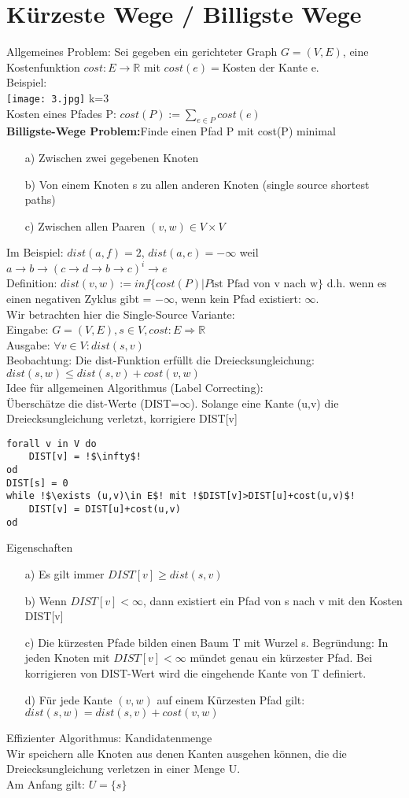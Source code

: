\documentclass[a4paper]{article}
\begin{document}
\section{Kürzeste Wege / Billigste Wege}
Allgemeines Problem: Sei gegeben ein gerichteter Graph $G=(V,E)$, eine Kostenfunktion $cost:E\rightarrow \mathbb{R}$ mit $cost(e)=$Kosten der Kante e.\\
Beispiel:\\
\texttt{[image: 3.jpg]} k=3\\
Kosten eines Pfades P: $cost(P):= \sum_{e\in P} cost(e)$\\
\textbf{Billigste-Wege Problem:}Finde einen Pfad P mit cost(P) minimal
\begin{itemize}
\item[a)] Zwischen zwei gegebenen Knoten
\item[b)] Von einem Knoten s zu allen anderen Knoten (single source shortest paths)
\item[c)] Zwischen allen Paaren $(v,w)\in V\times V$
\end{itemize}
Im Beispiel: $dist(a,f) = 2$, $dist(a,e) = -\infty$ weil $a\rightarrow b \rightarrow (c\rightarrow d\rightarrow b\rightarrow c)^i \rightarrow e$\\
Definition: $dist(v,w) := inf\lbrace cost(P)|P \text{ist Pfad von v nach w}\rbrace$ d.h. wenn es einen negativen Zyklus gibt = $-\infty$, wenn kein Pfad existiert: $\infty$.\\
Wir betrachten hier die Single-Source Variante:\\
Eingabe: $G=(V,E), s\in V, cost:E\Rightarrow\mathbb{R}$\\
Ausgabe: $\forall v\in V: dist(s,v)$\\
Beobachtung: Die dist-Funktion erfüllt die Dreiecksungleichung: $dist(s,w)\leq dist(s,v)+cost(v,w)$\\
Idee für allgemeinen Algorithmus (Label Correcting):\\
Überschätze die dist-Werte (DIST=$\infty$). Solange eine Kante (u,v) die Dreiecksungleichung verletzt, korrigiere DIST[v]\\
\begin{lstlisting}[escapechar=!]
forall v in V do
	DIST[v] = !$\infty$!
od
DIST[s] = 0
while !$\exists (u,v)\in E$! mit !$DIST[v]>DIST[u]+cost(u,v)$!
	DIST[v] = DIST[u]+cost(u,v)
od
\end{lstlisting}
Eigenschaften
\begin{itemize}
\item[a)] Es gilt immer $DIST[v] \geq dist(s,v)$
\item[b)] Wenn $DIST[v] < \infty$, dann existiert ein Pfad von s nach v mit den Kosten DIST[v]
\item[c)] Die kürzesten Pfade bilden einen Baum T mit Wurzel s. Begründung: In jeden Knoten mit $DIST[v] < \infty$ mündet genau ein kürzester Pfad. Bei korrigieren von DIST-Wert wird die eingehende Kante von T definiert.
\item[d)] Für jede Kante $(v,w)$ auf einem Kürzesten Pfad gilt: $dist(s,w) = dist(s,v)+cost(v,w)$
\end{itemize}
Effizienter Algorithmus: Kandidatenmenge\\
Wir speichern alle Knoten aus denen Kanten ausgehen können, die die Dreiecksungleichung verletzen in einer Menge U.\\
Am Anfang gilt: $U=\{s\}$
\end{document}

